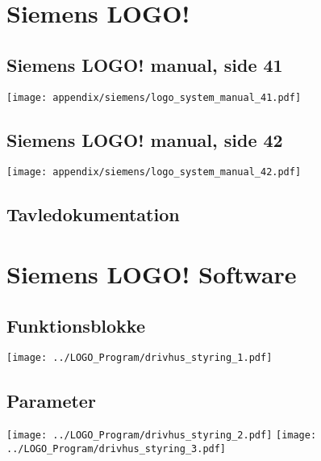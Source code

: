 \newpage
\section{Siemens LOGO!}

\subsection{Siemens LOGO! manual, side 41}
\label{man:logo_side_41}
\texttt{[image: appendix/siemens/logo\_system\_manual\_41.pdf]}

\subsection{Siemens LOGO! manual, side 42}
\label{man:logo_side_42}
\texttt{[image: appendix/siemens/logo\_system\_manual\_42.pdf]}

\subsection{Tavledokumentation}


\section{Siemens LOGO! Software}
\subsection{Funktionsblokke}
\texttt{[image: ../LOGO\_Program/drivhus\_styring\_1.pdf]}
\subsection{Parameter}
\texttt{[image: ../LOGO\_Program/drivhus\_styring\_2.pdf]}
\newpage
\texttt{[image: ../LOGO\_Program/drivhus\_styring\_3.pdf]}
%